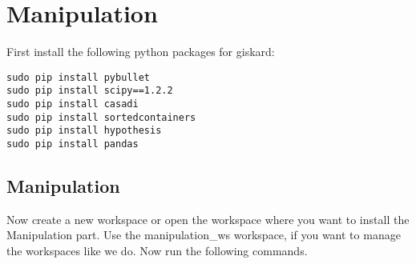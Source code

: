 \documentclass[main.tex]{subfiles}
\begin{document}
\section{Manipulation}
\label{sec:Manipulation}

First install the following python packages for giskard:
\begin{lstlisting}
sudo pip install pybullet
sudo pip install scipy==1.2.2
sudo pip install casadi
sudo pip install sortedcontainers
sudo pip install hypothesis
sudo pip install pandas
\end{lstlisting}
	
	\subsection{Manipulation}
Now create a new workspace or open the workspace where you want to install the Manipulation part. Use the manipulation\_ws workspace, if you want to manage the workspaces like we do. Now run the following commands.	

\begin{mdframed}[backgroundcolor=mygray, rightline=false]

\end{mdframed}
	
	
\end{document}
